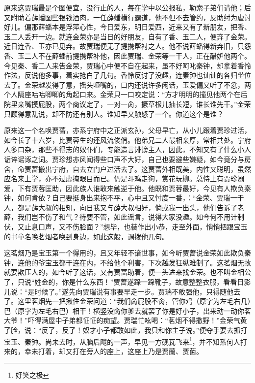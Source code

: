 \documentclass[12pt,oneside]{book}
\begin{document}
原来这贾瑞最是个图便宜，没行止的人，每在学中以公报私，勒索子弟们请他；后又附助着薛蟠图些银钱酒肉，一任薛蟠横行霸道，他不但不去管约，反助纣为虐讨好儿。偏那薛蟠本是浮萍心性，今日爱东，明日爱西，近来又有了新朋友，把香、玉二人丢开一边。就连金荣亦是当日的好朋友，自有了香、玉二人，便弃了金荣。近日连香、玉亦已见弃。故贾瑞便无了提携帮衬之人。他不说薛蟠得新弃旧，只怨香、玉二人不在薛蟠前提携帮补他，因此贾瑞、金荣等一干人，正在醋妒他两个。今见秦、香二人来告金荣，贾瑞心中便不自在起来，虽不好呵叱秦钟，却拿着香怜作法，反说他多事，着实抢白了几句。香怜反讨了没趣，连秦钟也讪讪的各归坐位去了。金荣越发得了意，摇头咂嘴的，口内还说许多闲话，玉爱偏又听了不忿，两个人隔座咕咕唧唧的角起口来。金荣只一口咬定说：“方才明明的撞见他两个在后院里亲嘴摸屁股，两个商议定了，一对一肏，撅草根儿抽长短，谁长谁先干。”金荣只顾得意乱说，却不防还有别人。谁知早又触怒了一个。你道这个是谁？

原来这一个名唤贾蔷，亦系宁府中之正派玄孙，父母早亡，从小儿跟着贾珍过活，如今长了十六岁，比贾蓉生的还风流俊俏。他弟兄二人最相亲厚，常相共处。宁府人多口杂，那些不得志的奴仆们，专能造言诽谤主人，因此，不知又有了什么小人诟谇谣诼之词。贾珍想亦风闻得些口声不大好，自己也要避些嫌疑，如今竟分与房舍，命贾蔷搬出宁府，自去立门户过活去了。这贾蔷外相既美，内性又聪明，虽然应名来上学，亦不过虚掩眼目而已。仍是斗鸡走狗，赏花玩柳。总恃上有贾珍溺爱，下有贾蓉匡助，因此族人谁敢来触逆于他。他既和贾蓉最好，今见有人欺负秦钟，如何肯依？自己要挺身出来抱不平，心中且又忖度一番，：“金荣、贾瑞一干人，都是薛大叔的相知，向日我又与薛大叔相好，倘或我一出头，他们告诉了老薛，我们岂不伤了和气？待要不管，如此谣言，说得大家没趣。如今何不用计制伏，又止息口声，又不伤脸面？”想毕，也装作出小恭，走至外面，悄悄把跟宝玉的书童名唤茗烟者唤到身边，如此这般，调拨他几句。

这茗烟乃是宝玉第一个得用的，且又年轻不谙世事，如今听贾蔷说金荣如此欺负秦钟，连他的爷宝玉都干连在内，不给他个利害，下次越发狂纵难制了。这茗烟无故就要欺压人的，如今听了这话，又有贾蔷助着，便一头进来找金荣。也不叫金相公了，只说“姓金的，你是什么东西！”贾蔷遂跺一跺靴子，故意整整衣服，看看日影儿说：“是时候了。”遂先向贾瑞说有事要早走一步。贾瑞不敢强他，只得随他去了。这里茗烟先一把揪住金荣问道：“我们肏屁股不肏，管你鸡（原字为左毛右几）巴（原字为左毛右巴）相干！横竖没肏你爹去就罢了你是好小子，出来动一动你茗大爷！”吓得满屋中子弟都怔怔的痴望。贾瑞忙吆喝：“茗烟不得撒野！”金荣气黄了脸，说：“反了，反了！奴才小子都敢如此，我只和你主子说。”便夺手要去抓打宝玉、秦钟。尚未去时，从脑后飕的一声，早见一方砚瓦飞来\footnote{好笑之极}，并不知系何人打来的，幸未打着，却又打在旁人的座上，这座上乃是贾蘭、贾菌。
\end{document}
